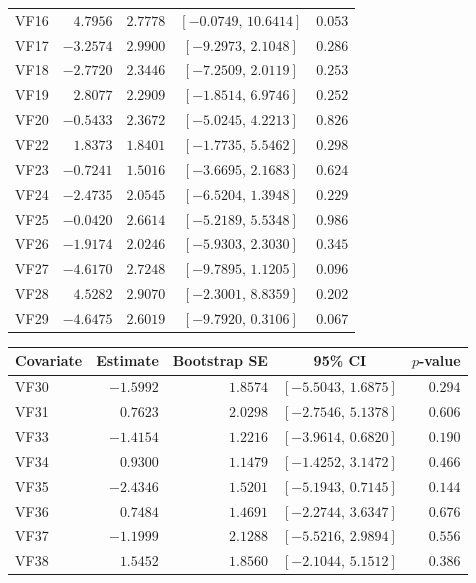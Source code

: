 \documentclass[10pt]{notes}
\begin{document}
\begin{landscape}
\begin{table}[p]
\begin{minipage}[t]{0.49\linewidth}
\begin{tabular}{lrrcr}
    VF16 & $4.7956$ & $2.7778$ & $[-0.0749,\,10.6414]$ & $0.053$ \\
    VF17 & $-3.2574$ & $2.9900$ & $[-9.2973,\,2.1048]$ & $0.286$ \\
    VF18 & $-2.7720$ & $2.3446$ & $[-7.2509,\,2.0119]$ & $0.253$ \\
    VF19 & $2.8077$ & $2.2909$ & $[-1.8514,\,6.9746]$ & $0.252$ \\
    VF20 & $-0.5433$ & $2.3672$ & $[-5.0245,\,4.2213]$ & $0.826$ \\
    VF22 & $1.8373$ & $1.8401$ & $[-1.7735,\,5.5462]$ & $0.298$ \\
    VF23 & $-0.7241$ & $1.5016$ & $[-3.6695,\,2.1683]$ & $0.624$ \\
    VF24 & $-2.4735$ & $2.0545$ & $[-6.5204,\,1.3948]$ & $0.229$ \\
    VF25 & $-0.0420$ & $2.6614$ & $[-5.2189,\,5.5348]$ & $0.986$ \\
    VF26 & $-1.9174$ & $2.0246$ & $[-5.9303,\,2.3030]$ & $0.345$ \\
    VF27 & $-4.6170$ & $2.7248$ & $[-9.7895,\,1.1205]$ & $0.096$ \\
    VF28 & $4.5282$ & $2.9070$ & $[-2.3001,\,8.8359]$ & $0.202$ \\
    VF29 & $-4.6475$ & $2.6019$ & $[-9.7920,\,0.3106]$ & $0.067$ \\
    \hline
    \end{tabular}
    \end{minipage}
    \hfill
    \begin{minipage}[t]{0.49\linewidth}
    \centering
    \begin{tabular}{lrrcr}
    \hline
    Covariate & Estimate & Bootstrap SE & 95\% CI & $p$-value \\
    \hline
    VF30 & $-1.5992$ & $1.8574$ & $[-5.5043,\,1.6875]$ & $0.294$ \\
    VF31 & $0.7623$ & $2.0298$ & $[-2.7546,\,5.1378]$ & $0.606$ \\
    VF33 & $-1.4154$ & $1.2216$ & $[-3.9614,\,0.6820]$ & $0.190$ \\
    VF34 & $0.9300$ & $1.1479$ & $[-1.4252,\,3.1472]$ & $0.466$ \\
    VF35 & $-2.4346$ & $1.5201$ & $[-5.1943,\,0.7145]$ & $0.144$ \\
    VF36 & $0.7484$ & $1.4691$ & $[-2.2744,\,3.6347]$ & $0.676$ \\
    VF37 & $-1.1999$ & $2.1288$ & $[-5.5216,\,2.9894]$ & $0.556$ \\
    VF38 & $1.5452$ & $1.8560$ & $[-2.1044,\,5.1512]$ & $0.386$ \\

\end{tabular}
\end{minipage}
\end{table}
\end{landscape}
\end{document}
